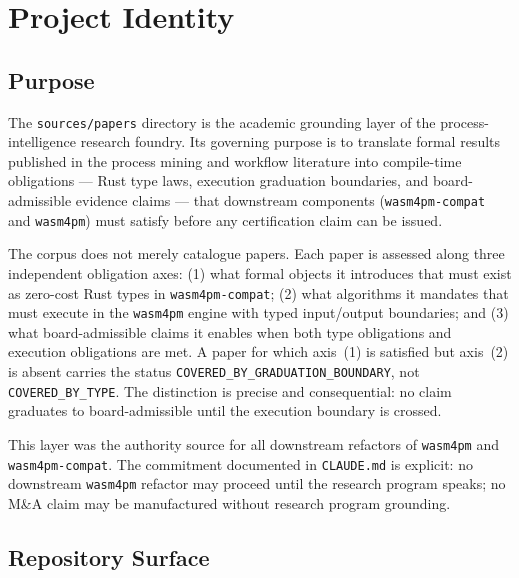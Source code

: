 
\section{Project Identity}
\label{sec:sources-papers-identity}

\subsection{Purpose}
\label{sec:sources-papers-identity-purpose}

The \texttt{sources/papers} directory is the academic grounding layer of the
process-intelligence research foundry. Its governing purpose is to translate
formal results published in the process mining and workflow literature into
compile-time obligations --- Rust type laws, execution graduation boundaries,
and board-admissible evidence claims --- that downstream components
(\texttt{wasm4pm-compat} and \texttt{wasm4pm}) must satisfy before any
certification claim can be issued.

The corpus does not merely catalogue papers. Each paper is assessed along
three independent obligation axes: (1) what formal objects it introduces that
must exist as zero-cost Rust types in \texttt{wasm4pm-compat}; (2) what
algorithms it mandates that must execute in the \texttt{wasm4pm} engine with
typed input/output boundaries; and (3) what board-admissible claims it enables
when both type obligations and execution obligations are met. A paper for which
axis~(1) is satisfied but axis~(2) is absent carries the status
\texttt{COVERED\_BY\_GRADUATION\_BOUNDARY}, not \texttt{COVERED\_BY\_TYPE}.
The distinction is precise and consequential: no claim graduates to
board-admissible until the execution boundary is crossed.

This layer was the authority source for all downstream refactors of
\texttt{wasm4pm} and \texttt{wasm4pm-compat}. The commitment documented in
\texttt{CLAUDE.md} is explicit: no downstream \texttt{wasm4pm} refactor may
proceed until the research program speaks; no M\&A claim may be manufactured
without research program grounding.

\subsection{Repository Surface}
\label{sec:sources-papers-identity-surface}


